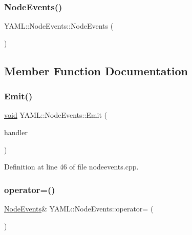 \subsubsection{\texorpdfstring{NodeEvents()}{NodeEvents()}\hspace{0.1cm}{\footnotesize\ttfamily [3/3]}}
{\footnotesize\ttfamily Y\+A\+M\+L\+::\+Node\+Events\+::\+Node\+Events (\begin{DoxyParamCaption}\item[{\mbox{\hyperlink{class_y_a_m_l_1_1_node_events}{Node\+Events}} \&\&}]{ }\end{DoxyParamCaption})\hspace{0.3cm}{\ttfamily [delete]}}



\subsection{Member Function Documentation}
\mbox{\label{class_y_a_m_l_1_1_node_events_a78054559195250e112ee535d32b984e3}} 
\subsubsection{\texorpdfstring{Emit()}{Emit()}}
{\footnotesize\ttfamily \mbox{\hyperlink{glad_8h_a950fc91edb4504f62f1c577bf4727c29}{void}} Y\+A\+M\+L\+::\+Node\+Events\+::\+Emit (\begin{DoxyParamCaption}\item[{\mbox{\hyperlink{class_y_a_m_l_1_1_event_handler}{Event\+Handler}} \&}]{handler }\end{DoxyParamCaption})}



Definition at line 46 of file nodeevents.\+cpp.

\mbox{\label{class_y_a_m_l_1_1_node_events_a26db8c756e2eaba3f35760e49896fb4c}} 
\subsubsection{\texorpdfstring{operator=()}{operator=()}\hspace{0.1cm}{\footnotesize\ttfamily [1/2]}}
{\footnotesize\ttfamily \mbox{\hyperlink{class_y_a_m_l_1_1_node_events}{Node\+Events}}\& Y\+A\+M\+L\+::\+Node\+Events\+::operator= (\begin{DoxyParamCaption}\item[{const \mbox{\hyperlink{class_y_a_m_l_1_1_node_events}{Node\+Events}} \&}]{ }\end{DoxyParamCaption})\hspace{0.3cm}{\ttfamily [delete]}}

